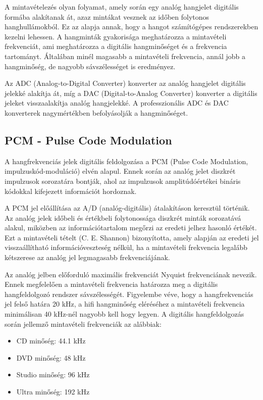 A mintavételezés olyan folyamat, amely során egy analóg hangjelet digitális formába alakítanak át, azaz mintákat vesznek az időben folytonos hanghullámokból. 
Ez az alapja annak, hogy a hangot számítógépes rendszerekben kezelni lehessen. A hangminták gyakorisága meghatározza a mintavételi frekvenciát, 
ami meghatározza a digitális hangminőséget és a frekvencia tartományt. Általában minél magasabb a mintavételi frekvencia, annál jobb a hangminőség, 
de nagyobb sávszélességet is eredményez.

Az ADC (Analog-to-Digital Converter) konverter az analóg hangjelet digitális jelekké alakítja át, míg a DAC (Digital-to-Analog Converter) 
konverter a digitális jeleket visszaalakítja analóg hangjelekké. 
A professzionális ADC és DAC konverterek nagymértékben befolyásolják a hangminőséget.

\subsection{PCM - Pulse Code Modulation}
A hangfrekvenciás jelek digitális feldolgozása a PCM (Pulse Code Modulation, impulzuskód-moduláció) elvén alapul. 
Ennek során az analóg jelet diszkrét impulzusok sorozatára bontják, ahol az impulzusok 
amplitúdóértékei bináris kódokkal kifejezett információt hordoznak.

A PCM jel előállítása az A/D (analóg-digitális) átalakításon keresztül történik. 
Az analóg jelek időbeli és értékbeli folytonossága diszkrét minták sorozatává alakul, 
miközben az információtartalom megőrzi az eredeti jelhez hasonló értékét. 
Ezt a mintavételi tételt (C. E. Shannon) bizonyította, amely alapján az eredeti jel 
visszaállítható információveszteség nélkül, ha a mintavételi frekvencia legalább 
kétszerese az analóg jel legmagasabb frekvenciájának.

Az analóg jelben előforduló maximális frekvenciát Nyquist frekvenciának nevezik. 
Ennek megfelelően a mintavételi frekvencia határozza meg a digitális hangfeldolgozó rendszer sávszélességét. 
Figyelembe véve, hogy a hangfrekvenciás jel felső határa 20 kHz, a hifi hangminőség eléréséhez a 
mintavételi frekvencia minimálisan 40 kHz-nél nagyobb kell hogy legyen. A digitális hangfeldolgozás során jellemző mintavételi frekvenciák az alábbiak:
\begin{itemize}
    \item CD minőség: 44.1 kHz
    \item DVD minőség: 48 kHz
    \item Studio minőség: 96 kHz
    \item Ultra minőség: 192 kHz
\end{itemize}

